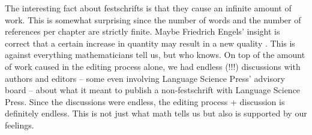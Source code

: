 \documentclass[output=paper,colorlinks,citecolor=brown]{langscibook}
\begin{document}
The interesting fact about festschrifts is that they cause an infinite amount of work. This is somewhat
surprising since the number of words and the number of references per chapter are strictly
finite. Maybe Friedrich Engels' insight is correct that a certain increase in quantity may result in a new
quality \citep[]{Engels1873a-u}. This is against everything mathematicians tell us, but who knows.
On top of the amount of work caused in the editing process alone, we had endless (!!!) discussions
with authors and editors -- some even involving Language Science Press' advisory board -- about what it meant to publish a non-festschrift with Language Science
Press. Since the discussions were endless, the editing process + discussion is definitely endless. This
is not just what math tells us but also is supported by our feelings.
\end{document}
